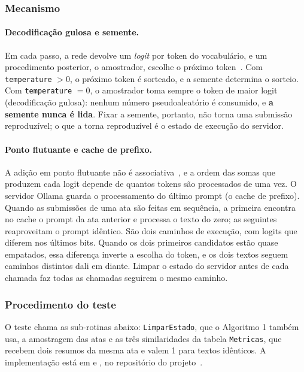 \documentclass[12pt]{article}
\begin{document}
\subsubsection{Mecanismo}\label{sec:mecanismo}

\paragraph{Decodificação gulosa e semente.} Em cada passo, a rede devolve um
\textit{logit} por token do vocabulário, e um procedimento posterior, o
amostrador, escolhe o próximo token~\cite{holtzman2020}. Com
\texttt{temperature} $> 0$, o próximo token é sorteado, e a semente determina o
sorteio. Com \texttt{temperature} $= 0$, o amostrador toma sempre o token de
maior logit (decodificação gulosa): nenhum número pseudoaleatório é consumido,
e \textbf{a semente nunca é lida}. Fixar a semente, portanto, não torna uma
submissão reproduzível; o que a torna reproduzível é o estado de execução do
servidor.

\paragraph{Ponto flutuante e cache de prefixo.} A adição em ponto flutuante não
é associativa~\cite{goldberg1991}, e a ordem das somas que produzem cada logit
depende de quantos tokens são processados de uma vez. O servidor Ollama guarda
o processamento do último prompt (o cache de prefixo). Quando as submissões de
uma ata são feitas em sequência, a primeira encontra no cache o prompt da ata
anterior e processa o texto do zero; as seguintes reaproveitam o prompt
idêntico. São dois caminhos de execução, com logits que diferem nos últimos
bits. Quando os dois primeiros candidatos estão quase empatados, essa diferença
inverte a escolha do token, e os dois textos seguem caminhos distintos dali em
diante. Limpar o estado do servidor antes de cada chamada faz todas as chamadas
seguirem o mesmo caminho.

\subsubsection{Procedimento do teste}\label{sec:det-procedimento}

O teste chama as sub-rotinas abaixo: \texttt{LimparEstado}, que o Algoritmo 1
também usa, a amostragem das atas e as três similaridades da tabela
\texttt{Metricas}, que recebem dois resumos da mesma ata e valem 1 para textos
idênticos. A implementação está em
 e
, no repositório do
projeto~\cite{delpiccolo2026}.
\end{document}
